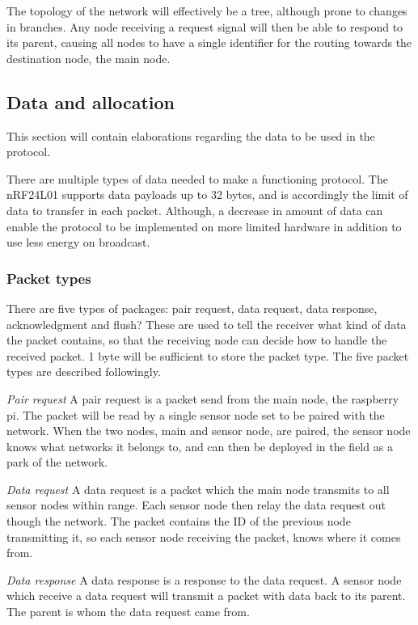 The topology of the network will effectively be a tree, although prone to changes in branches.
Any node receiving a request signal will then be able to respond to its parent, causing all nodes to have a single identifier for the routing towards the destination node, the main node.



\subsection{Data and allocation}
This section will contain elaborations regarding the data to be used in the protocol.

There are multiple types of data needed to make a functioning protocol. The nRF24L01 supports data payloads up to 32 bytes, and is accordingly the limit of data to transfer in each packet.
Although, a decrease in amount of data can enable the protocol to be implemented on more limited hardware in addition to use less energy on broadcast.

\subsubsection{Packet types}
There are five types of packages: pair request, data request, data response, acknowledgment and flush?
These are used to tell the receiver what kind of data the packet contains, so that the receiving node can decide how to handle the received packet. 1 byte will be sufficient to store the packet type.
The five packet types are described followingly.

\textit{Pair request}\newline
A pair request is a packet send from the main node, the raspberry pi.
The packet will be read by a single sensor node set to be paired with the network.
When the two nodes, main and sensor node, are paired, the sensor node knows what networks it belongs to, and can then be deployed in the field as a park of the network. 

\textit{Data request}\newline
A data request is a packet which the main node transmits to all sensor nodes within range.
Each sensor node then relay the data request out though the network.
The packet contains the ID of the previous node transmitting it, so each sensor node receiving the packet, knows where it comes from.

\textit{Data response}\newline
A data response is a response to the data request.
A sensor node which receive a data request will transmit a packet with data back to its parent.
The parent is whom the data request came from.

